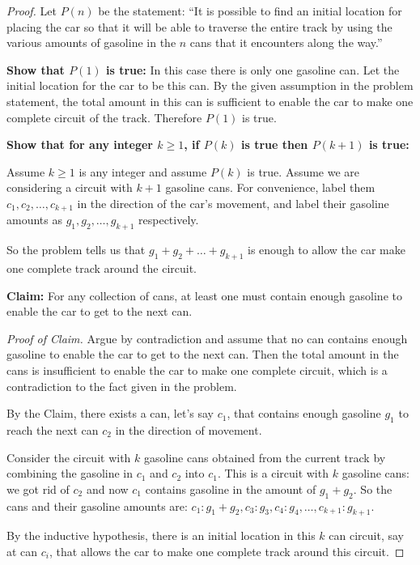 \documentclass[14pt]{extarticle}
\begin{document}
\begin{proof}
    Let $P(n)$ be the statement: ``It is possible to find an initial location for placing the car so that it will be able to traverse the entire track by using the various amounts of gasoline in the $n$ cans that it encounters along the way.''

    {\bf Show that $P(1)$ is true:} In this case there is only one gasoline can. Let the initial location for the car to be this can. By the given assumption in the problem statement, the total amount in this can is sufficient to enable the car to make one complete circuit of the track. Therefore $P(1)$ is true.

        {\bf Show that for any integer $k \geq 1$, if $P(k)$ is true then $P(k+1)$ is true:}

    Assume $k \geq 1$ is any integer and assume $P(k)$ is true. Assume we are considering a circuit with $k+1$ gasoline cans. For convenience, label them $c_1, c_2, \ldots, c_{k+1}$ in the direction of the car's movement, and label their gasoline amounts as $g_1, g_2, \ldots, g_{k+1}$ respectively.

    So the problem tells us that $g_1 + g_2 + \ldots + g_{k+1}$ is enough to allow the car make one complete track around the circuit.

        {\bf Claim:} For any collection of cans, at least one must
    contain enough gasoline to enable the car to get to the
    next can.

        {\it Proof of Claim.} Argue by contradiction and assume that no can contains enough gasoline to enable the car to get to the next can. Then the total amount in the cans is insufficient to enable the car to make one complete circuit, which is a contradiction to the fact given in the problem.

    By the Claim, there exists a can, let's say $c_1$, that contains enough gasoline $g_1$ to reach the next can $c_2$ in the direction of movement.

    Consider the circuit with $k$ gasoline cans obtained from the current track by combining the gasoline in $c_1$ and $c_2$ into $c_1$. This is a circuit with $k$ gasoline cans: we got rid of $c_2$ and now $c_1$ contains gasoline in the amount of $g_1 + g_2$. So the cans and their gasoline amounts are: $c_1: g_1 + g_2, c_3: g_3, c_4: g_4, \ldots, c_{k+1}: g_{k+1}$.

    By the inductive hypothesis, there is an initial location in this $k$ can circuit, say at can $c_i$, that allows the car to make one complete track around this circuit.


\end{proof}
\end{document}

